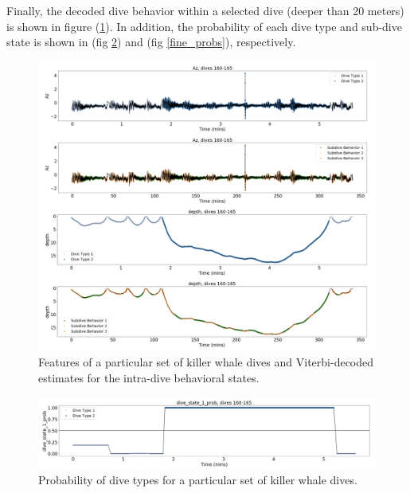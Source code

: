 Finally, the decoded dive behavior within a selected dive (deeper than 20 meters) is shown in figure (\ref{fig:labeled_dives}). In addition, the probability of each dive type and sub-dive state is shown in (fig \ref{fig:coarse_probs}) and (fig \ref{fine_probs}), respectively.

\begin{figure}[h!]
	\centering
	\includegraphics[width=5in]{../Plots/labeled_dives.png}
	\caption{Features of a particular set of killer whale dives and Viterbi-decoded estimates for the intra-dive behavioral states.}
	\label{fig:labeled_dives}
\end{figure}
%
\begin{figure}[h!]
	\centering
	\includegraphics[width=5in]{../Plots/Coarse_state_probs.png}
	\caption{Probability of dive types for a particular set of killer whale dives.}
	\label{fig:coarse_probs}
\end{figure}
%
